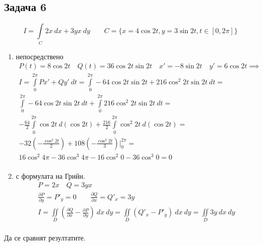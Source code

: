 \documentclass[a4paper,fleqn,12pt]{article}
\theoremstyle{definition}
\begin{document}
\subsection*{Задача 6}
$$I= \int\limits_C 2x \ dx + 3yx \ dy \qquad C = \{x= 4\cos 2t , y = 3\sin 2t, t \in [0,2\pi] \}$$
\begin{enumerate}
\item непосредствено
\begin{gather*}
P(t) = 8\cos 2t \quad Q(t) = 36 \cos 2t \sin 2t  \quad x' = -8\sin 2t \quad y' = 6\cos 2t \implies \\
I = \int\limits_0 ^{2\pi} Px' + Qy' \ dt = \int\limits_0 ^{2\pi} -64\cos 2t \sin 2t + 216 \cos^2 2t \sin 2t  \ dt  = \\
\int\limits_0 ^{2\pi} -64\cos 2t \sin 2t \ dt + \int\limits_0 ^{2\pi} 216 \cos^2 2t \sin 2t  \ dt = \\
- \frac{64}{2} \int\limits_0 ^{2\pi} \cos 2t\ d(\cos 2t) + \frac{216}{2} \int\limits_0 ^{2\pi}  \cos^2 2t \ d(\cos 2t) = \\
-32 \left(- \frac{\cos^2 2t}{2} \right) + 108 \left(- \frac{\cos^3 2t}{3} \right) \Big|_0 ^{2\pi}= \\
16\cos^2 4\pi - 36 \cos^3 4\pi - 16\cos^2 0 - 36 \cos^3 0 = 0\\ 
\end{gather*}
\item с формулата на Грийн.
\begin{gather*}
P = 2x \quad Q = 3yx \\
\frac{\partial P}{\partial y} = P'_y = 0  \qquad \frac{\partial Q}{\partial x} = Q'_x = 3y \\
I = \iint\limits_D \left( \frac{\partial Q}{\partial x} - \frac{\partial P}{\partial y} \right) \ dx \ dy = \iint\limits_D \left( Q'_x  - P'_y \right) \ dx \ dy = \iint\limits_D 3y \ dx \ dy \\
\end{gather*}
\end{enumerate}
Да се сравнят резултатите. 
\end{document}
